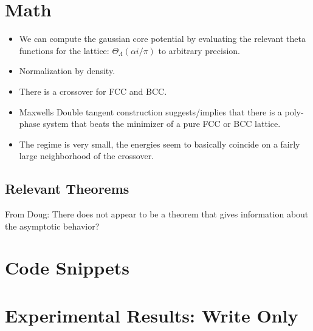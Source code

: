 \documentclass[onecolumn,11pt,final]{amsart}
\begin{document}
\section{Math}

\begin{itemize}

\item We can compute the gaussian core potential by evaluating the relevant theta functions for the lattice: $\Theta_\Lambda(\alpha i/\pi)$ to arbitrary precision.
\item Normalization by density.
\item There is a crossover for FCC and BCC.
\item Maxwells Double tangent construction suggests/implies that there is a poly-phase system that beats the minimizer of a pure FCC or BCC lattice.
\item The regime is very small, the energies seem to basically coincide on a fairly large neighborhood of the crossover.
\end{itemize}

\subsection{Relevant Theorems}

From Doug:  There does not appear to be a theorem that gives information about the asymptotic behavior?




\section{Code Snippets}



%






\section{Experimental Results: Write Only}
\end{document}
